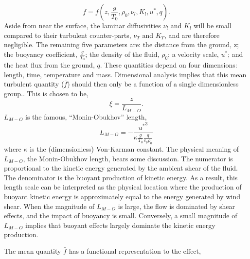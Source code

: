 \begin{equation}
\bar f = f(z,\frac{g}{T_0},\rho_0,\nu_l,K_l,u^*,q).
\end{equation}
Aside from near the surface, the laminar diffusivities $\nu_l$ and $K_l$ will be
 small compared to their turbulent counter-parts, $\nu_T$ and $K_T$, and
 are therefore negligible. 
The remaining five parameters are: the distance from the ground, z; the
buoyancy coefficient, $\frac{g}{T_0}$; the density of the fluid,
$\rho_0$; a velocity scale, $u^*$; and the heat flux from the ground,
$q$. 
%
% 
These quantities depend on four dimensions: length, time, temperature
and mass. Dimensional analysis implies that this mean turbulent quantity
($\bar f$) should then only be a function of a single dimensionless
group.\cite{munson2012fundamentals}. This is chosen to be,
\begin{equation}
 \xi = \frac{z}{L_{M-O}}.
\end{equation}
$L_{M-O}$ is the famous, ``Monin-Obukhov'' length,
\begin{equation}
 L_{M-O} = -\frac{{u^*}^3}{\kappa \frac{g}{T_0} \frac{q}{c_p \rho_0}}
\end{equation}
where $\kappa$ is the (dimensionless) Von-Karman constant. 
The physical meaning of $L_{M-O}$, the Monin-Obukhov length, bears some discussion. 
The numerator is proportional to the kinetic energy generated by the ambient 
shear of the fluid. The denominator is the buoyant production of kinetic energy. 
As a result, this length scale can be interpreted as the physical location where the
production of buoyant kinetic energy is approximately equal to the energy generated 
by wind shear. When the magnitude of $L_{M-O}$ is large, the flow is dominated
by shear effects, and the impact of buoyancy is small. Conversely, a small 
magnitude of $L_{M-O}$ implies that buoyant effects largely dominate the kinetic energy production.

The mean quantity $\bar f$ has a
functional representation to the effect,

